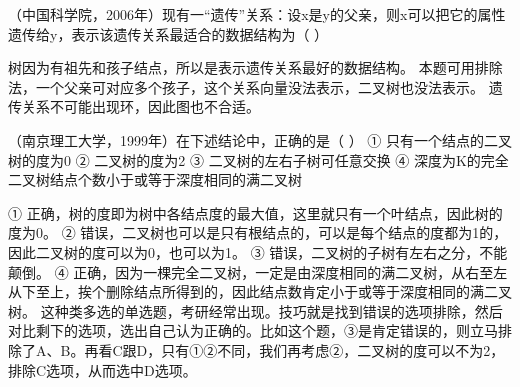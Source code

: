 \question （中国科学院，2006年）现有一``遗传''关系：设x是y的父亲，则x可以把它的属性遗传给y，表示该遗传关系最适合的数据结构为（
）
\par{}
\begin{solution}树因为有祖先和孩子结点，所以是表示遗传关系最好的数据结构。
本题可用排除法，一个父亲可对应多个孩子，这个关系向量没法表示，二叉树也没法表示。
遗传关系不可能出现环，因此图也不合适。
\end{solution}
\question （南京理工大学，1999年）在下述结论中，正确的是（ ） ①
只有一个结点的二叉树的度为0 ② 二叉树的度为2 ③ 二叉树的左右子树可任意交换
④ 深度为K的完全二叉树结点个数小于或等于深度相同的满二叉树
\par{}
\begin{solution}①
正确，树的度即为树中各结点度的最大值，这里就只有一个叶结点，因此树的度为0。
②
错误，二叉树也可以是只有根结点的，可以是每个结点的度都为1的，因此二叉树的度可以为0，也可以为1。
③ 错误，二叉树的子树有左右之分，不能颠倒。 ④
正确，因为一棵完全二叉树，一定是由深度相同的满二叉树，从右至左从下至上，挨个删除结点所得到的，因此结点数肯定小于或等于深度相同的满二叉树。
这种类多选的单选题，考研经常出现。技巧就是找到错误的选项排除，然后对比剩下的选项，选出自己认为正确的。比如这个题，③是肯定错误的，则立马排除了A、B。再看C跟D，只有①②不同，我们再考虑②，二叉树的度可以不为2，排除C选项，从而选中D选项。
\end{solution}
